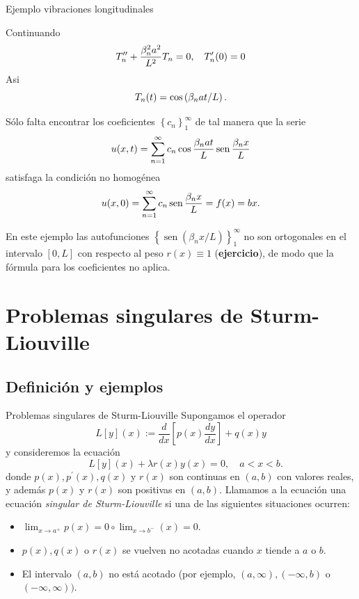 

 
{Ejemplo vibraciones longitudinales}

Continuando 
$$\small
T_{n}^{\prime \prime}+\frac{\beta_{n}^{2} a^{2}}{L^{2}} T_{n}=0, \quad T_{n}^{\prime}(0)=0
$$
Asi
$$\small T_{n}(t)=\cos \left(\beta_{n} a t / L\right).$$



Sólo falta encontrar los coeficientes $\left\{c_{n}\right\}_{1}^{\infty}$ de tal manera que la serie
$$\small
u(x, t)=\sum_{n=1}^{\infty} c_{n} \cos \frac{\beta_{n} a t}{L} \operatorname{sen} \frac{\beta_{n} x}{L}
$$
satisfaga la condición no homogénea
$$\small
u(x, 0)=\sum_{n=1}^{\infty} c_{n} \operatorname{sen} \frac{\beta_{n} x}{L}=f(x)=b x .
$$


En este ejemplo las autofunciones $\left\{\operatorname{sen}\left(\beta_{n} x / L\right)\right\}_{1}^{\infty}$ no son ortogonales en el intervalo $[0, L]$ con respecto al peso $r(x) \equiv 1$ (\textbf{ejercicio}), de  modo que la  fórmula para los coeficientes no aplica.
 

 
 
 \section{Problemas singulares de Sturm-Liouville}
 
 \subsection{Definición y ejemplos}
{Problemas singulares de Sturm-Liouville}
Supongamos el operador
$$L[y](x):=\frac{d}{d x}\left[p(x) \frac{d y}{d x}\right]+q(x) y$$
y consideremos la ecuación
 $$\quad L[y](x)+\lambda r(x) y(x)=0, \quad a<x<b.$$
donde  $p(x), p^{\prime}(x), q(x)$ y $r(x)$ son  continuas en $(a, b)$ con valores reales, y además $p(x)$ y $r(x)$ son positivas en $(a, b)$. Llamamos a la ecuación  una ecuación \emph{singular de Sturm-Liouville}  si una  de las siguientes situaciones ocurren:

\begin{itemize}
 \item $\lim _{x \to a^{+}} p(x)=0 \circ \lim _{x\to b^-}(x)=0$.
 \item $p(x), q(x)$ o $r(x)$ se vuelven no acotadas cuando $x$ tiende a $a$ o $b$.
 \item El intervalo $(a, b)$ no está acotado (por ejemplo, $(a, \infty),(-\infty, b)$ o $(-\infty, \infty))$.
\end{itemize}






